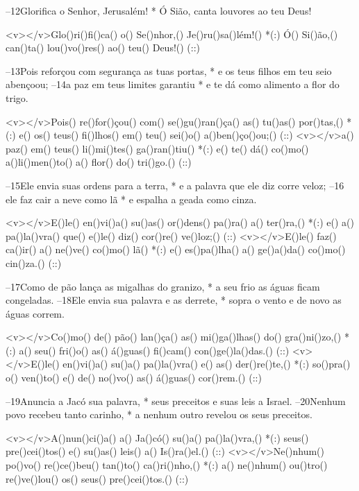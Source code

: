 –12Glorifica o Senhor, Jerusalém! *
Ó Sião, canta louvores ao teu Deus!

<v></v>Glo()ri()fi()ca() o() Se()nhor,() Je()ru()sa()lém!() *(:)
Ó() Si()ão,() can()ta() lou()vo()res() ao() teu() Deus!() (::)

–13Pois reforçou com segurança as tuas portas, *
e os teus filhos em teu seio abençoou;
–14a paz em teus limites garantiu *
e te dá como alimento a flor do trigo.

<v></v>Pois() re()for()çou() com() se()gu()ran()ça() as() tu()as() por()tas,() *(:)
e() os() teus() fi()lhos() em() teu() sei()o() a()ben()ço()ou;() (::)
<v></v>a() paz() em() teus() li()mi()tes() ga()ran()tiu() *(:)
e() te() dá() co()mo() a()li()men()to() a() flor() do() tri()go.() (::)

–15Ele envia suas ordens para a terra, *
e a palavra que ele diz corre veloz;
–16 ele faz cair a neve como lã *
e espalha a geada como cinza.

<v></v>E()le() en()vi()a() su()as() or()dens() pa()ra() a() ter()ra,() *(:)
e() a() pa()la()vra() que() e()le() diz() cor()re() ve()loz;() (::)
<v></v>E()le() faz() ca()ir() a() ne()ve() co()mo() lã() *(:)
e() es()pa()lha() a() ge()a()da() co()mo() cin()za.() (::)

–17Como de pão lança as migalhas do granizo, *
a seu frio as águas ficam congeladas.
–18Ele envia sua palavra e as derrete, *
sopra o vento e de novo as águas correm.

<v></v>Co()mo() de() pão() lan()ça() as() mi()ga()lhas() do() gra()ni()zo,() *(:)
a() seu() fri()o() as() á()guas() fi()cam() con()ge()la()das.() (::)
<v></v>E()le() en()vi()a() su()a() pa()la()vra() e() as() der()re()te,() *(:)
so()pra() o() ven()to() e() de() no()vo() as() á()guas() cor()rem.() (::)

–19Anuncia a Jacó sua palavra, *
seus preceitos e suas leis a Israel.
–20Nenhum povo recebeu tanto carinho, *
a nenhum outro revelou os seus preceitos.

<v></v>A()nun()ci()a() a() Ja()có() su()a() pa()la()vra,() *(:)
seus() pre()cei()tos() e() su()as() leis() a() Is()ra()el.() (::)
<v></v>Ne()nhum() po()vo() re()ce()beu() tan()to() ca()ri()nho,() *(:)
a() ne()nhum() ou()tro() re()ve()lou() os() seus() pre()cei()tos.() (::)